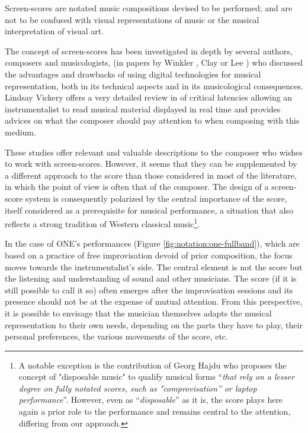 Screen-scores are notated music compositions devised to be performed; and are not to be confused with visual representations of music or the musical interpretation of visual art.

The concept of screen-scores has been investigated in depth by several authors, composers and musicologists, (in papers by Winkler \cite{winkler_realtime-score._2004}, Clay \cite{adams_inventing_2008} or Lee \cite{lee_real-time_2012}) who discussed the advantages and drawbacks of using digital technologies for musical representation, both in its technical aspects and in its musicological consequences. Lindsay Vickery offers a very detailed review in \cite{vickery_limitations_2014} of critical latencies allowing an instrumentalist to read musical material displayed in real time and provides advices on what the composer should pay attention to when composing with this medium.

These studies offer relevant and valuable descriptions to the composer who wishes to work with screen-scores. However, it seems that they can be supplemented by a different approach to the score than those considered in most of the literature, in which the point of view is often that of the composer. The design of a screen-score system is consequently polarized by the central importance of the score, itself considered as a prerequisite for musical performance, a situation that also reflects a strong tradition of Western classical music\footnote{A notable exception is the contribution of Georg Hajdu \cite{hajdu_disposable_2016} who proposes the concept of "disposable music" to qualify musical forms “\textit{that rely on a lesser degree on fully notated scores, such as "comprovisation” or laptop performance}”. However, even as “\textit{disposable}” as it is, the score plays here again a prior role to the performance and remains central to the attention, differing from our approach.}.

In the case of ONE's performances (Figure \ref{fig:notation:one-fullband}), which are based on a practice of free improvisation devoid of prior composition, the focus moves towards the instrumentalist's side. The central element is not the score but the listening and understanding of sound and other musicians. The score (if it is still possible to call it so) often emerges after the improvisation sessions and its presence should not be at the expense of mutual attention. From this perspective, it is possible to envisage that the musician themselves adapts the musical representation to their own needs, depending on the parts they have to play, their personal preferences, the various movements of the score, etc.

